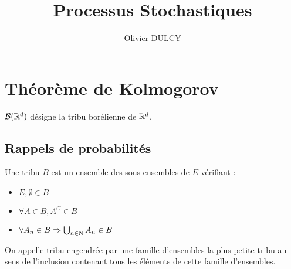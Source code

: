 

\title{Processus Stochastiques}
\author{Olivier DULCY}
\date{}



\pagestyle{theme}

\newcommand{\HRule}{\rule{\linewidth}{0.5mm}}
\newcommand\tikzmark[2][]{
  \tikz[remember picture,inner sep=\tabcolsep,outer sep=0,baseline=(#1.base),align=left]{\node[minimum width=\hsize](#1){$#2$};}
}


\maketitle

\frontmatter

\mainmatter

\chapter{Théorème de Kolmogorov}

$\mathcal{B}(\mathbb{R}^d)$ désigne la tribu borélienne de $\mathbb{R}^d$. \\

\section{Rappels de probabilités}

\begin{definition}
Une tribu $B$ est un ensemble des sous-ensembles de $E$ vérifiant :
\begin{itemize}
  \item $E, \emptyset \in B$
  \item $\forall A \in B, A^C \in B$
  \item $\forall A_n \in B \Rightarrow \bigcup_{n\in\mathrm{N}} A_n \in B$
\end{itemize}
\end{definition}

\begin{definition}
On appelle tribu engendrée par une famille d'ensembles la plus petite tribu au sens de l'inclusion contenant tous les éléments de cette famille d'ensembles.
\end{definition}

